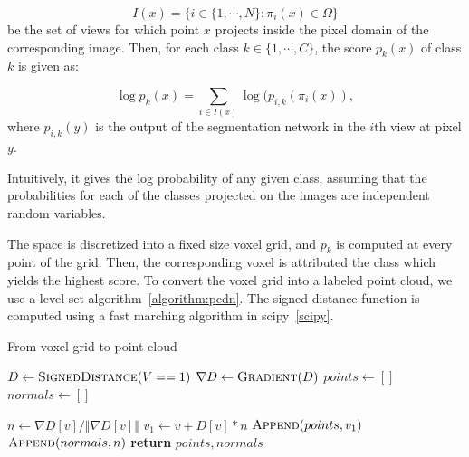 $$
I(x) = \{ i \in
\{1,\cdots, N \} : \pi_i(x) \in \Omega \}
$$
be the set of views for which point
$x$ projects inside the pixel domain of the corresponding image. Then, for each
class $k \in \{ 1,\cdots, C \}$, the score $p_k(x)$ of class $k$ is given as:

$$
\log p_k(x) = \sum_{i\in I(x)} \log ( p_{i,k} (\pi_i(x) ),
$$
where $p_{i,k} (y)$ is the output of the segmentation network in the $i$th view
at pixel $y$.

Intuitively, it gives the log probability of any given class, assuming that the
probabilities for each of the classes projected on the images are independent
random variables.

The space is discretized into a fixed size voxel grid, and $p_k$ is computed at every
point of the grid. Then, the corresponding voxel is attributed the class which
yields the highest score. To convert the voxel grid into a labeled point cloud,
we use a level set algorithm~\ref{algorithm:pcdn}. The signed distance function is computed using a
fast marching algorithm in scipy~\ref{scipy}.

\begin{algorithm}
    \caption{From voxel grid to point cloud}
    \label{algorithm:pcdn}
    \begin{algorithmic}[1]
        \State $D \gets \Call{SignedDistance}{V == 1}$
        \State $\nabla D \gets \Call{Gradient}{D}$
        \State $points \gets []$
        \State $normals \gets []$

            \State $n \gets \nabla D [v] / \Vert \nabla D [v] \Vert$
            \State $v_1 \gets v + D[v] * n$
            \State $\Call{Append}{points, v_1}$
            \State $\Call{Append}{normals, n}$
        \EndFor{}
        \State \textbf{return} $points, normals$
        \EndFunction
    \end{algorithmic}
\end{algorithm}

